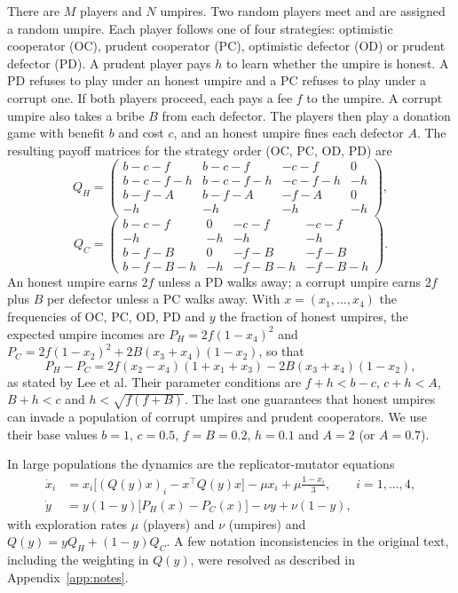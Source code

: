 \documentclass[11pt]{article}
\begin{document}
There are $M$ players and $N$ umpires. Two random players meet and are assigned a random umpire.
Each player follows one of four strategies: optimistic cooperator (OC), prudent cooperator (PC),
optimistic defector (OD) or prudent defector (PD). A prudent player pays $h$ to learn whether the
umpire is honest. A PD refuses to play under an honest umpire and a PC refuses to play under a
corrupt one. If both players proceed, each pays a fee $f$ to the umpire. A corrupt umpire also
takes a bribe $B$ from each defector. The players then play a donation game with benefit $b$ and
cost $c$, and an honest umpire fines each defector $A$. The resulting payoff matrices for the
strategy order (OC, PC, OD, PD) are
\begin{equation}
Q_H=\begin{pmatrix}
b-c-f & b-c-f & -c-f & 0\\
b-c-f-h & b-c-f-h & -c-f-h & -h\\
b-f-A & b-f-A & -f-A & 0\\
-h & -h & -h & -h
\end{pmatrix},
\end{equation}
\begin{equation}
Q_C=\begin{pmatrix}
b-c-f & 0 & -c-f & -c-f\\
-h & -h & -h & -h\\
b-f-B & 0 & -f-B & -f-B\\
b-f-B-h & -h & -f-B-h & -f-B-h
\end{pmatrix}.
\end{equation}
An honest umpire earns $2f$ unless a PD walks away; a corrupt umpire earns $2f$ plus $B$ per
defector unless a PC walks away. With $x=(x_1,\dots,x_4)$ the frequencies of OC, PC, OD, PD and
$y$ the fraction of honest umpires, the expected umpire incomes are
$P_H=2f(1-x_4)^2$ and $P_C=2f(1-x_2)^2+2B(x_3+x_4)(1-x_2)$, so that
\begin{equation}
P_H-P_C=2f(x_2-x_4)(1+x_1+x_3)-2B(x_3+x_4)(1-x_2),\label{eq:ump}
\end{equation}
as stated by Lee et al. Their parameter conditions are
$f+h<b-c$, $c+h<A$, $B+h<c$ and $h<\sqrt{f(f+B)}$. The last one guarantees that honest umpires
can invade a population of corrupt umpires and prudent cooperators. We use their base values
$b=1$, $c=0.5$, $f=B=0.2$, $h=0.1$ and $A=2$ (or $A=0.7$).

In large populations the dynamics are the replicator-mutator equations
\begin{align}
\dot x_i &= x_i\big[(Q(y)x)_i - x^{\top}Q(y)x\big] - \mu x_i + \mu\frac{1-x_i}{3},\qquad i=1,\dots,4,\label{eq:rm1}\\
\dot y &= y(1-y)\big[P_H(x)-P_C(x)\big] - \nu y + \nu(1-y),\label{eq:rm2}
\end{align}
with exploration rates $\mu$ (players) and $\nu$ (umpires) and $Q(y)=yQ_H+(1-y)Q_C$. A few notation inconsistencies in the original text,
including the weighting in $Q(y)$, were resolved as described in Appendix~\ref{app:notes}.
\end{document}
